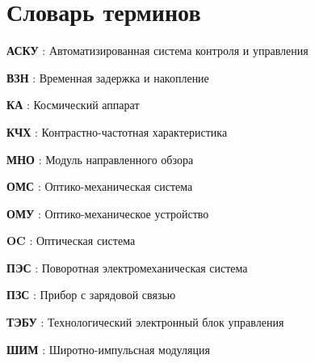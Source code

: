 \chapter*{Словарь терминов}             %



\textbf{АСКУ} : Автоматизированная система контроля и управления

\textbf{ВЗН} : Временная задержка и накопление

\textbf {КА} : Космический аппарат

\textbf {КЧХ} : Контрастно-частотная характеристика

\textbf {МНО} : Модуль направленного обзора

\textbf {ОМС} : Оптико-механическая система

\textbf {ОМУ} : Оптико-механическое  устройство


\textbf {OC} : Оптическая система

\textbf {ПЭС} : Поворотная электромеханическая система

\textbf {ПЗС} : Прибор с зарядовой связью

\textbf {ТЭБУ} : Технологический электронный блок управления 

\textbf {ШИМ} : Широтно-импульсная модуляция



